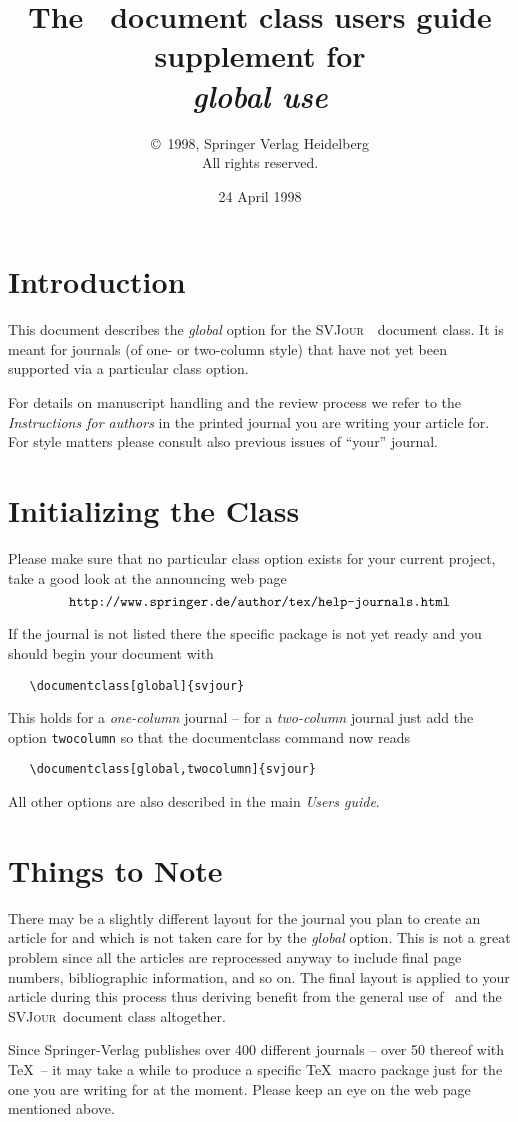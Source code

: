\documentclass[draft]{ltxguide}[1995/11/28]
\title{The \SJour\ document class users guide\\supplement
for\\\textit{global use}}
\author{\copyright~1998, Springer Verlag Heidelberg\\
   All rights reserved.}
\date{24 April 1998}
\newcommand{\SJour}{\textsc{SVJour}}
\begin{document}
\maketitle

\section{Introduction}
\label{sec:intro}
This document describes the \textit{global} option for the \SJour\
\LaTeXe\ document class. It is meant for journals (of one- or two-column
style) that have not yet been supported via a particular class option.

For details on manuscript handling and the review process we refer to
the \emph{Instructions for authors} in the printed journal you are
writing your article for. For style matters please consult also previous
issues of ``your'' journal.

\section{Initializing the Class}
\label{sec:opt}

Please make sure that no particular class option exists for your current
project, take a good look at the announcing web page
\[\verb|http://www.springer.de/author/tex/help-journals.html|\]

If the journal is not listed there the specific package is not yet
ready and you should begin your document with
\begin{verbatim}
   \documentclass[global]{svjour}
\end{verbatim}
This holds for a \emph{one-column} journal -- for a \emph{two-column}
journal just add the option \verb|twocolumn| so that the documentclass
command now reads
\begin{verbatim}
   \documentclass[global,twocolumn]{svjour}
\end{verbatim}
All other options are also described
in the main \emph{Users guide}.

\section{Things to Note}

There may be a slightly different layout for the journal you plan to
create an article for and which is not taken care for by the
\emph{global} option. This is not a great problem since all the articles
are reprocessed anyway to include final page numbers, bibliographic
information, and so on. The final layout is applied to your article
during this process thus deriving benefit from the general use of
\LaTeXe\ and the \SJour\ document class altogether.

Since Springer-Verlag publishes over 400 different journals -- over 50
thereof with \TeX\ -- it may take a while to produce a specific \TeX\
macro package just for the one you are writing for at the moment. Please
keep an eye on the web page mentioned above.
\end{document}

